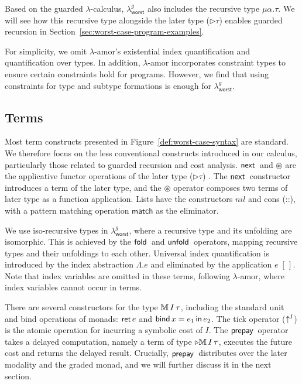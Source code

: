 Based on the guarded $\lambda$-calculus, $\lambda^g_{\mathsf{worst}}$ also includes the recursive type $\mu \alpha.\tau$.
We will see how this recursive type alongside the later type ($\triangleright \tau$) enables guarded recursion in Section~\ref{sec:worst-case-program-examples}.

For simplicity, we omit $\lambda$-amor's existential index quantification and quantification over types. 
In addition, $\lambda$-amor incorporates constraint types to ensure certain constraints hold for programs. 
However, we find that using constraints for type and subtype formations is enough for $\lambda^g_{\mathsf{worst}}$.

\subsection{Terms}
Most term constructs presented in Figure~\ref{def:worst-case-syntax} are standard. We therefore focus on the less conventional constructs introduced in our calculus, particularly those related to 
guarded recursion and cost analysis.
$\mathsf{next}\,$ and $\circledast$ are the applicative functor operations of the later type ($\triangleright \tau$) \citep{mcbrideP08}.
The $\mathsf{next}\,$ constructor introduces a term of the later type, and the $\circledast$ operator composes two terms of later type as a function application.
Lists have the constructors $nil$ and cons (::), with a pattern matching operation $\mathsf{match}$ as the eliminator.

We use iso-recursive types in $\lambda^g_{\mathsf{worst}}$, where a recursive type and its unfolding are isomorphic.
This is achieved by the $\mathsf{fold}\,$ and $\mathsf{unfold}\,$ operators, mapping recursive types and their unfoldings to each other.
Universal index quantification is introduced by the index abstraction $\Lambda.e$ and eliminated by the application $e\;[\,]$.
Note that index variables are omitted in these terms, following $\lambda$-amor, where index variables cannot occur in terms.

There are several constructors for the type $\mathbb{M}\,{I}\, \tau$, including the standard unit and bind operations of monads: $\mathsf{ret}\, e$ and $\mathsf{bind}\, x= e_1 \, \mathsf{in}\, e_2$.
The tick operator ($\uparrow^{I}$) is the atomic operation for incurring a symbolic cost of $I$.
The $\mathsf{prepay}\,$ operator takes a delayed computation, namely a term of type $\triangleright \mathbb{M}\,{I}\, \tau$,
executes the future cost and returns the delayed result. Crucially, $\mathsf{prepay}\,$ distributes over the later modality and the graded monad, and we will 
further discuss it in the next section.

